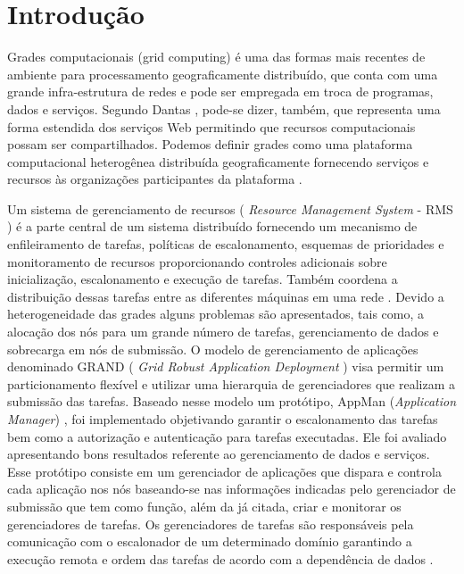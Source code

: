 \section{Introdução}
\label{cap:introducao}

Grades computacionais (grid computing) é uma das formas mais recentes de ambiente para processamento geograficamente distribuído, que conta com uma grande infra-estrutura de redes e pode ser empregada em troca de programas, dados e serviços. Segundo Dantas \cite{Dantas2005}, pode-se dizer, também, que representa uma forma estendida dos serviços Web permitindo que recursos computacionais possam ser compartilhados. Podemos definir grades como uma plataforma computacional heterogênea distribuída geograficamente fornecendo serviços e recursos às organizações participantes da plataforma \cite{Dantas2005}. 
       
Um sistema de gerenciamento de recursos ( \emph{Resource Management System} - RMS ) é a parte central de um sistema distribuído fornecendo um mecanismo de enfileiramento de tarefas, políticas de escalonamento, esquemas de prioridades e monitoramento de recursos proporcionando controles adicionais sobre inicialização, escalonamento e execução de tarefas. Também coordena a distribuição dessas tarefas entre as diferentes máquinas em uma rede \cite{condor2007, Bayucan2007, Mangan2006}. Devido a heterogeneidade das grades alguns problemas são apresentados, tais como, a alocação dos nós para um grande número de tarefas, gerenciamento de dados e sobrecarga em nós de submissão. O modelo de gerenciamento de aplicações denominado GRAND ( \emph{Grid Robust Application Deployment} ) \cite{Mangan2006} visa permitir um particionamento flexível e utilizar uma hierarquia de gerenciadores que realizam a submissão das tarefas. Baseado nesse modelo um protótipo, AppMan (\emph{Application Manager}) \cite{Vargas2003}, foi implementado objetivando garantir o escalonamento das tarefas bem como a autorização e autenticação para tarefas executadas. Ele foi avaliado apresentando bons resultados referente ao gerenciamento de dados e serviços. Esse protótipo consiste em um gerenciador de aplicações que dispara e controla cada aplicação nos nós baseando-se nas informações indicadas pelo gerenciador de submissão que tem como função, além da já citada, criar e monitorar os gerenciadores de tarefas. Os gerenciadores de tarefas são responsáveis pela comunicação com o escalonador de um determinado domínio garantindo a execução remota e ordem das tarefas de acordo com a dependência de dados \cite{Mangan2006}.

